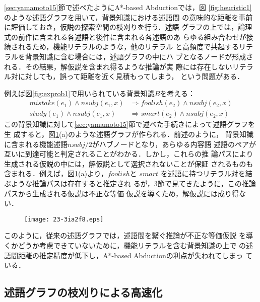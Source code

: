\documentclass[japanese]{jnlp_1.4}
\begin{document}
\ref{sec:yamamoto15}節で述べたようにA*-based Abductionでは，図
\ref{fig:heuristic1}のような述語グラフを用いて，背景知識における述語間
の意味的な距離を事前に評価しておき，仮説の探索空間の枝刈りを行う．述語
グラフの上では，論理式の前件に含まれる各述語と後件に含まれる各述語のあ
らゆる組み合わせが接続されるため，機能リテラルのような，他のリテラル
と高頻度で共起するリテラルを背景知識に含む場合には，述語グラフの中にハ
ブとなるノードが形成される．その結果，解仮説を含まれ得るような推論が実
際には存在しないリテラル対に対しても，誤って距離を近く見積もってしまう，
という問題がある．

例えば図\ref{fig:exprob1}で用いられている背景知識$B$を考える：
\begin{align*}
mistake(e_1) \land nsubj(e_1,x) & \Rightarrow foolish(e_2) \land
nsubj(e_2,x) \\
study(e_1) \land nsubj(e_1,x) & \Rightarrow smart(e_2) \land
nsubj(e_2,x)
\end{align*}
この背景知識に対して\ref{sec:yamamoto15}節で述べた手続きによって述語グラフを生
成すると，図\ref{fig:sw1}(a)のような述語グラフが作られる．前述のように，
背景知識に含まれる機能述語$\mathit{nsubj}/2$がハブノードとなり，あらゆる内容語
述語のペアが互いに到達可能と判定されることがわかる．しかし，これらの推
論パスにより生成される仮説の中には，解仮説として選択されないことが保証
されるものも含まれる．例えば，図\ref{fig:sw1}(a)より，$\mathit{foolish}$と
$\mathit{smart}$ を述語に持つリテラル対を結ぶような推論パスは存在すると推定され
るが，3節で見てきたように，この推論パスから生成される仮説は不正な等価
仮説を導くため，解仮説には成り得ない．

\begin{figure}[t]
\begin{center}
\texttt{[image: 23-3ia2f8.eps]}
\end{center}
\label{fig:sw1}
\end{figure}

このように，従来の述語グラフでは，述語間を繋ぐ推論が不正な等価仮説
を導くかどうか考慮できていないために，機能リテラルを含む背景知識の上で
の述語間距離の推定精度が低下し，A*-based Abductionの利点が失われてしまっ
ている．


\subsection{述語グラフの枝刈りによる高速化}
\label{sec:sw-sw}
\end{document}
